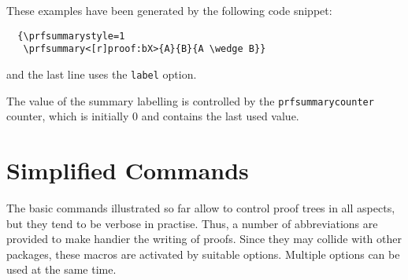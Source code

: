 \documentclass{amsart}
\begin{document}
These examples have been generated by the following code snippet:
\begin{verbatim}
  {\prfsummarystyle=1
   \prfsummary<[r]proof:bX>{A}{B}{A \wedge B}}
\end{verbatim}
and the last line uses the \verb|label| option.\vspace{2ex}

The value of the summary labelling is controlled by the
\verb|prfsummarycounter| counter, which is initially $0$ and contains
the last used value.

\clearpage
\section{Simplified Commands}\label{sec:simplified_commands}
The basic commands illustrated so far allow to control proof trees in
all aspects, but they tend to be verbose in practise. Thus, a number
of abbreviations are provided to make handier the writing of proofs.
Since they may collide with other packages, these macros are activated
by suitable options. Multiple options can be used at the same time.
\end{document}
